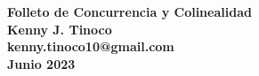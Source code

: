 \begin{center}
    \textbf
    {
            {\LARGE Folleto de Concurrencia y Colinealidad}\\\vspace{4mm}
    Kenny J. Tinoco\\\vspace{1mm}
    kenny.tinoco10@gmail.com\\\vspace{1mm}
    Junio 2023
    }
\end{center}

\thispagestyle{first-page-style}

\tableofcontents